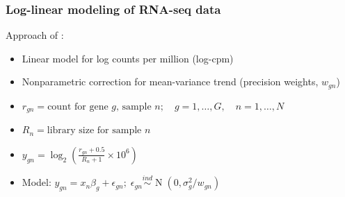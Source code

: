 \documentclass{beamer}
\newcommand{\op}{\operatorname}
\newcommand{\ind}{\stackrel{ind}{\sim}}
\begin{document}
\begin{frame}
  \frametitle{Log-linear modeling of RNA-seq data}
  Approach of \citep{voom}:
  \begin{itemize}
    \item Linear model for log counts per million (log-cpm)
    \item Nonparametric correction for mean-variance trend (precision weights, $w_{gn}$)
    \item $r_{gn} = \mbox{count for gene }g \mbox{, sample }n;\quad g=1,\ldots,G,\quad n=1,\ldots,N$
    \item $R_n = \mbox{library size for sample }n$
    \item $y_{gn} = \log_2 \left(\frac{r_{gn}+0.5}{R_n+1}\times 10^6\right)$
    \item Model: $y_{gn} = x_n\beta_g + \epsilon_{gn};\; \epsilon_{gn} \ind \op{N}(0,\sigma^2_g/w_{gn})$
  \end{itemize}
\end{frame}
\end{document}
